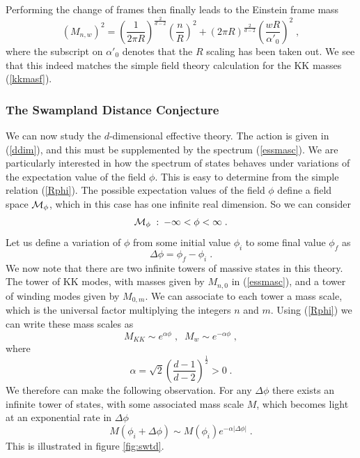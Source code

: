 \documentclass[11pt,a4paper]{article}
\numberwithin{equation}{section}
\numberwithin{table}{section}\setlength{\multlinegap}{25pt}
\newcommand{\be}{\begin{equation}}
\newcommand{\ee}{\end{equation}}
\begin{document}
Performing the change of frames then finally leads to the Einstein frame mass
\be
\left(M_{n,w}\right)^2 = \left(\frac{1}{2\pi R}\right)^{\frac{2}{d-2}} \left(\frac{n}{R}\right)^2  + \left(2\pi R\right)^{\frac{2}{d-2}} \left(\frac{w R}{\alpha'_0}\right)^2 \;,
\label{essmasc}
\ee
where the subscript on $\alpha'_0$ denotes that the $R$ scaling has been taken out.
We see that this indeed matches the simple field theory calculation for the KK masses (\ref{kkmasf}). 

\subsubsection{The Swampland Distance Conjecture}

We can now study the $d$-dimensional effective theory. The action is given in (\ref{ddim}), and this must be supplemented by the spectrum (\ref{essmasc}). We are particularly interested in how the spectrum of states behaves under variations of the expectation value of the field $\phi$. This is easy to determine from the simple relation (\ref{Rphi}). The possible expectation values of the field $\phi$ define a field space ${\cal M}_{\phi}$, which in this case has one infinite real dimension. So we can consider
\be
{\cal M}_{\phi} \;: \: -\infty < \phi < \infty \;.
\ee
Let us define a variation of $\phi$ from some initial value $\phi_i$ to some final value $\phi_f$ as
\be
\Delta \phi = \phi_f - \phi_i \;.
\ee 
We now note that there are two infinite towers of massive states in this theory. The tower of KK modes, with masses given by $M_{n,0}$ in (\ref{essmasc}), and a tower of winding modes given by $M_{0,m}$. We can associate to each tower a mass scale, which is the universal factor multiplying the integers $n$ and $m$. Using (\ref{Rphi}) we can write these mass scales as
\be
\label{swcircma}
M_{KK} \sim e^{\alpha \phi} \;,\;\; M_{w} \sim e^{-\alpha \phi} \;,
\ee
where 
\be
\alpha = \sqrt{2} \left(\frac{d-1}{d-2} \right)^{\frac12} > 0 \;.
\ee
We therefore can make the following observation. For any $\Delta \phi$ there exists an infinite tower of states, with some associated mass scale $M$, which becomes light at an exponential rate in $\Delta \phi$
\be
M\left(\phi_i + \Delta \phi\right) \sim M\left(\phi_i\right) e^{-\alpha \left|\Delta \phi\right|} \;.
\label{exsc}
\ee
This is illustrated in figure \ref{fig:swtd}. 
\end{document}
